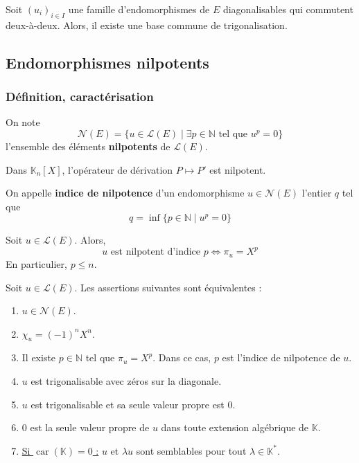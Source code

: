 	\begin{theorem}
		Soit $(u_i)_{i \in I}$ une famille d'endomorphismes de $E$ diagonalisables qui commutent deux-à-deux. Alors, il existe une base commune de trigonalisation.
	\end{theorem}

	\newpage

	\subsection{Endomorphismes nilpotents}

	\subsubsection{Définition, caractérisation}


	\begin{definition}
		On note
		\[ \mathcal{N}(E) = \{ u \in \mathcal{L}(E) \mid \exists p \in \mathbb{N} \text{ tel que } u^p = 0 \} \]
		l'ensemble des éléments \textbf{nilpotents} de $\mathcal{L}(E)$.
	\end{definition}

	\begin{example}
		Dans $\mathbb{K}_n[X]$, l'opérateur de dérivation $P \mapsto P'$ est nilpotent.
	\end{example}

	\begin{definition}
		On appelle \textbf{indice de nilpotence} d'un endomorphisme $u \in \mathcal{N}(E)$ l'entier $q$ tel que
		\[ q = \inf \{ p \in \mathbb{N} \mid u^p = 0 \} \]
	\end{definition}

	\begin{proposition}
		Soit $u \in \mathcal{L}(E)$. Alors,
		\[ u \text{ est nilpotent d'indice } p \iff \pi_u = X^p \]
		En particulier, $p \leq n$.
	\end{proposition}

	\begin{theorem}
		\label{156-1}
		Soit $u \in \mathcal{L}(E)$. Les assertions suivantes sont équivalentes :
		\begin{enumerate}[label=(\roman*)]
			\item $u \in \mathcal{N}(E)$.
			\item $\chi_u = (-1)^n X^n$.
			\item Il existe $p \in \mathbb{N}$ tel que $\pi_u = X^p$. Dans ce cas, $p$ est l'indice de nilpotence de $u$.
			\item $u$ est trigonalisable avec zéros sur la diagonale.
			\item $u$ est trigonalisable et sa seule valeur propre est $0$.
			\item $0$ est la seule valeur propre de $u$ dans toute extension algébrique de $\mathbb{K}$.
			\item \underline{Si $\operatorname{car}(\mathbb{K}) = 0$ :} $u$ et $\lambda u$ sont semblables pour tout $\lambda \in \mathbb{K}^*$.
		\end{enumerate}
	\end{theorem}

